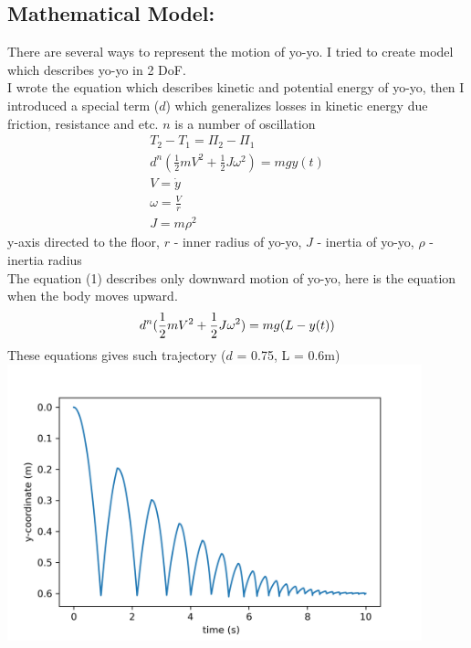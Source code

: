 \documentclass[a4paper,11pt,oneside,article]{memoir}
\begin{document}
\subsection{Mathematical Model:}
There are several ways to represent the motion of yo-yo. I tried to create model which describes yo-yo in 2 DoF. \\
I wrote the equation which describes kinetic and potential energy  of yo-yo, then I introduced a special term ($d$) which generalizes losses in kinetic energy due friction, resistance and etc. $n$ is a number of oscillation \\
\begin{equation}
    \begin{split}
        T_2 - T_1=\Pi_2-\Pi_1\\
        d^n(\frac{1}{2}mV^2 + \frac{1}{2}J\omega^2) = mgy(t)\\
        V = \dot y\\
        \omega = \frac{V}{r}\\
        J = m\rho^2
    \end{split}
\end{equation}
y-axis directed to the floor, $r$ - inner radius of yo-yo, $J$ - inertia of yo-yo, $\rho$ - inertia radius\\
The equation (1) describes only downward motion of yo-yo, here is the equation when the body moves upward.\\
\begin{equation}
    d^n(\frac{1}{2}mV^2 + \frac{1}{2}J\omega^2) = mg(L-y(t))\\
\end{equation}
These equations gives such trajectory ($d$ = 0.75, L = 0.6m)\\
\includegraphics[width=12cm]{images/pic3.png}\\
\end{document}
